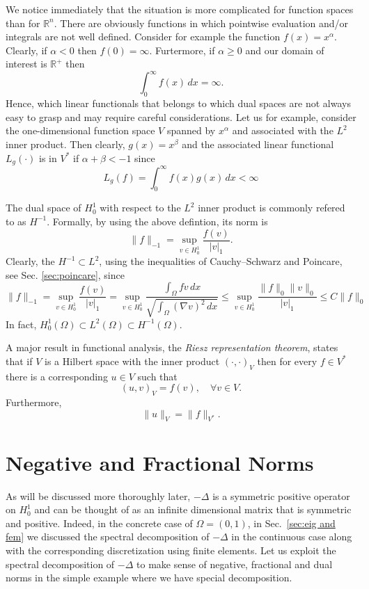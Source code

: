 We notice immediately that the situation is more complicated for function spaces than for $\mathbb{R}^n$. 
There are obviously functions in which pointwise evaluation 
and/or integrals are not well defined. Consider for example the
function $f(x) = x^\alpha$. Clearly, if $\alpha < 0$ then $f(0) = \infty$. Furtermore, 
if $\alpha \ge 0$ and  our domain of interest is $\mathbb{R}^+$ then
\[
\int_0^\infty f(x) \, dx = \infty .  
\]
Hence, which linear functionals that belongs to which dual spaces are not always easy to grasp 
and may require careful considerations. 
Let us for example, 
consider the one-dimensional function space $V$ spanned by  $x^\alpha$ and associated with the $L^2$ inner product.   
Then clearly, $g(x) = x^\beta$ and the associated  
linear functional $L_g(\cdot)$ is in $V^*$ if $\alpha + \beta < -1$ since
\[
L_g(f) = \int_0^\infty f(x) g(x) \, dx   < \infty  
\]

The dual space of $H^1_0$ with respect to the $L^2$ inner product 
is commonly refered to as 
$H^{-1}$. Formally, by using the above defintion, its norm is  
\[
\|f\|_{-1} = \sup_{v\in H^1_0} \frac{f(v)}{|v|_1} .    
\]
Clearly, the  $H^{-1} \subset L^2$, using 
the inequalities
of 
Cauchy–Schwarz and  
Poincare, see Sec. \ref{sec:poincare}, since
\[
\|f\|_{-1} = \sup_{v\in H^1_0} \frac{f(v)}{|v|_1} = \sup_{v\in H^1_0} \frac{\int_\Omega fv \,  dx}{\sqrt{\int_\Omega (\nabla v)^2 \, dx }}  \le  \sup_{v\in H^1_0} \frac{\|f \|_{0} \|v\|_0}{|v|_1} \le C \|f \|_{0}     
\]
In fact, $H_0^1(\Omega) \subset L^2 (\Omega) \subset H^{-1}(\Omega)$.   

A major result in functional analysis, the \emph{Riesz representation theorem}, 
states that if $V$ is a Hilbert space with the inner product $(\cdot, \cdot)_V$ then 
for every $f\in V^*$ there is a corresponding $u \in V$ such that
\[
(u, v)_V = f(v), \quad \forall v \in V.   
\]
Furthermore, 
\[
\|u\|_V = \|f\|_{V^*} . 
\]


\section{Negative and Fractional Norms}

As will be discussed more thoroughly later, 
$-\Delta$ is a symmetric positive operator on $H^1_0$ and can be thought of 
as an infinite dimensional matrix that is symmetric and positive.  
Indeed, in the concrete case of $\Omega = (0,1)$, in Sec.~\ref{sec:eig and fem} we discussed the spectral 
decomposition of $-\Delta$ in the continuous case along with the corresponding discretization using finite elements. 
Let us exploit the spectral decomposition of $-\Delta$ to make sense of negative, fractional and dual norms in 
the simple example where we have special decomposition. 


